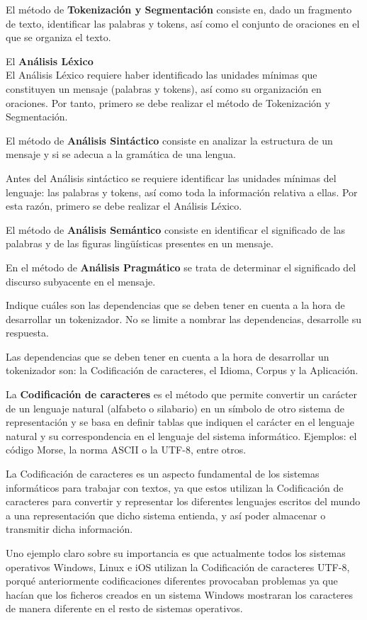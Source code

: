 \documentclass{exam}
\begin{document}
\begin{questions}
El método de {\bf Tokenización y Segmentación} consiste en, dado un fragmento de texto, identificar las palabras y tokens, así como el conjunto de oraciones en el que se organiza el texto.

El {\bf Análisis Léxico} \\
El Análisis Léxico requiere haber identificado las unidades mínimas que constituyen un mensaje (palabras y tokens), así como su organización en oraciones. Por tanto, primero se debe realizar el método de Tokenización y Segmentación.

El método de {\bf Análisis Sintáctico} consiste en analizar la estructura de un mensaje y si se adecua a la gramática de una lengua.

Antes del Análisis sintáctico se requiere identificar las unidades mínimas del lenguaje: las palabras y tokens, así como toda la información relativa a ellas. Por esta razón, primero se debe realizar el Análisis Léxico.

El método de {\bf Análisis Semántico} consiste en identificar el significado de las palabras y de las figuras lingüísticas presentes en un mensaje.

En el método de {\bf Análisis Pragmático} se trata de determinar el significado del discurso subyacente en el mensaje.

\question Indique cuáles son las dependencias que se deben tener en cuenta a la hora de desarrollar un tokenizador. No se limite a nombrar las dependencias, desarrolle su respuesta.

Las dependencias que se deben tener en cuenta a la hora de desarrollar un tokenizador son: la Codificación de caracteres, el Idioma, Corpus y la Aplicación.

La {\bf Codificación de caracteres} es el método que permite convertir un carácter de un lenguaje natural (alfabeto o silabario) en un símbolo de otro sistema de representación y se basa en definir tablas que indiquen el carácter en el lenguaje natural y su correspondencia en el lenguaje del sistema informático. Ejemplos: el código Morse, la norma ASCII o la UTF-8, entre otros. 

La Codificación de caracteres es un aspecto fundamental de los sistemas informáticos para trabajar con textos, ya que estos utilizan la Codificación de caracteres para convertir y representar los diferentes lenguajes escritos del mundo a una representación que dicho sistema entienda, y así poder almacenar o transmitir dicha información.

Uno ejemplo claro sobre su importancia es que actualmente todos los sistemas operativos Windows, Linux e iOS utilizan la Codificación de caracteres UTF-8, porqué anteriormente codificaciones diferentes provocaban problemas ya que hacían que los ficheros creados en un sistema Windows mostraran los caracteres de manera diferente en el resto de sistemas operativos. 


\end{questions}
\end{document}
